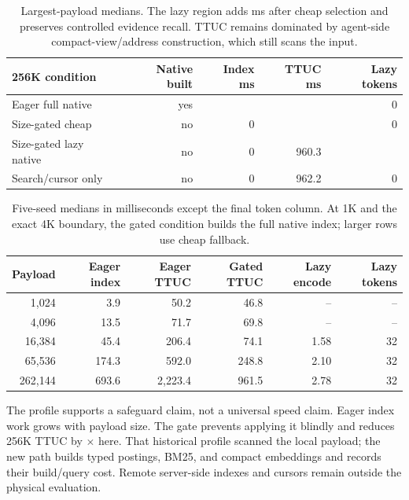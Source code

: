 \documentclass[11pt]{article}
\begin{document}
\begin{table}[H]
\centering
\small
\begin{tabular}{@{}lrrrr@{}}
\toprule
256K condition & Native built & Index ms & TTUC ms & Lazy tokens\\
\midrule
Eager full native & yes & \PaperSevenEagerLargestIndexMs{} & \PaperSevenEagerLargestTTUC{} & 0\\
Size-gated cheap & no & 0 & \PaperSevenGatedLargestTTUC{} & 0\\
Size-gated lazy native & no & 0 & 960.3 & \PaperSevenLazyRegionTokens{}\\
Search/cursor only & no & 0 & 962.2 & 0\\
\bottomrule
\end{tabular}
\caption{Largest-payload medians. The lazy region adds
\PaperSevenLazyRegionMs{} ms after cheap selection and preserves
\PaperSevenGatedRecall{} controlled evidence recall. TTUC remains dominated by
agent-side compact-view/address construction, which still scans the input.}
\label{tab:size-gate}
\end{table}

\begin{table}[H]
\centering
\small
\begin{tabular}{@{}rrrrrr@{}}
\toprule
Payload & Eager index & Eager TTUC & Gated TTUC & Lazy encode & Lazy tokens\\
\midrule
1,024 & 3.9 & 50.2 & 46.8 & -- & --\\
4,096 & 13.5 & 71.7 & 69.8 & -- & --\\
16,384 & 45.4 & 206.4 & 74.1 & 1.58 & 32\\
65,536 & 174.3 & 592.0 & 248.8 & 2.10 & 32\\
262,144 & 693.6 & 2,223.4 & 961.5 & 2.78 & 32\\
\bottomrule
\end{tabular}
\caption{Five-seed medians in milliseconds except the final token column. At
1K and the exact 4K boundary, the gated condition builds the full native index;
larger rows use cheap fallback.}
\label{tab:size-scaling}
\end{table}

The profile supports a safeguard claim, not a universal speed claim. Eager
index work grows with payload size. The gate prevents applying it blindly and
reduces 256K TTUC by \PaperSevenTTUCReduction{}$\times$ here. That historical
profile scanned the local payload; the new path builds typed postings, BM25,
and compact embeddings and records their build/query cost. Remote server-side
indexes and cursors remain outside the physical evaluation.
\end{document}
